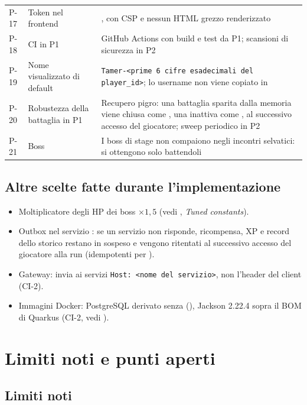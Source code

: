 \documentclass[11pt,a4paper]{article}
\begin{document}
\begin{xltabular}{\linewidth}{@{}L{0.9cm}L{3.6cm}Y@{}}
  P-17 & Token nel frontend & , con CSP e nessun HTML grezzo renderizzato \\
  P-18 & CI in P1 & GitHub Actions con build e test da P1; scansioni di sicurezza in P2 \\
  P-19 & Nome visualizzato di default & \texttt{Tamer-<prime 6 cifre esadecimali del player\_id>}; lo username non viene copiato in  \\
  P-20 & Robustezza della battaglia in P1 & Recupero pigro: una battaglia sparita dalla memoria viene chiusa come , una inattiva come , al successivo accesso del giocatore; sweep periodico in P2 \\
  P-21 & Boss & I boss di stage non compaiono negli incontri selvatici: si ottengono solo battendoli \\
  \bottomrule
\end{xltabular}

\subsection{Altre scelte fatte durante l'implementazione}

\begin{itemize}
  \item Moltiplicatore degli HP dei boss $\times 1{,}5$ (vedi , \emph{Tuned constants}).
  \item Outbox nel servizio : se un servizio non risponde, ricompensa, XP e record dello storico restano in sospeso e vengono ritentati al successivo accesso del giocatore alla run (idempotenti per ).
  \item Gateway: invia ai servizi \texttt{Host: <nome del servizio>}, non l'header  del client (CI-2).
  \item Immagini Docker: PostgreSQL derivato senza  (), Jackson 2.22.4 sopra il BOM di Quarkus (CI-2, vedi ).
\end{itemize}

\section{Limiti noti e punti aperti}\label{sec:aperti}

\subsection{Limiti noti}
\end{document}
